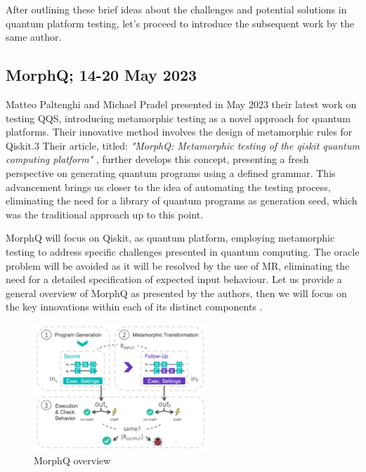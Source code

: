 \begin{itemize}
After outlining these brief ideas about the challenges and potential solutions in quantum platform testing, let's proceed to introduce the subsequent work by the same author.

\subsection{MorphQ; 14-20 May 2023}
\label{Ch3.1.2:MorphQ}
Matteo Paltenghi and Michael Pradel presented in May 2023 their latest work on testing QQS, introducing metamorphic testing as a novel approach for quantum platforms. Their innovative method involves the design of metamorphic rules for Qiskit.3 Their article, titled: \textit{"MorphQ: Metamorphic testing of the qiskit quantum computing platform"} \cite{paltenghi2023morphq}, further develops this concept, presenting a fresh perspective on generating quantum programs using a defined grammar. This advancement brings us closer to the idea of automating the testing process, eliminating the need for a library of quantum programs as generation seed, which was the traditional approach up to this point.\newline

MorphQ will focus on Qiskit, as quantum platform, employing metamorphic testing to address specific challenges presented in quantum computing. The oracle problem will be avoided as it will be resolved by the use of MR, eliminating the need for a detailed specification of expected input behaviour. Let us provide a general overview of MorphQ as presented by the authors, then we will focus on the key innovations within each of its distinct components .

\begin{figure}[H]
        \centering
        \includegraphics[width=0.58\textwidth]{TFM/photos/MorphQOverview.png}
        \caption{MorphQ overview \cite{paltenghi2023morphq}} 
        \label{Fig:MorphQOverview}
\end{figure}


\end{itemize}
